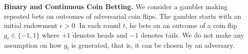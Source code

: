 % 
% 
% 
% 

\textbf{Binary and Continuous Coin Betting.}
We consider a gambler making repeated bets on outcomes of adversarial coin
flips. The gambler starts with an initial endowment $\epsilon > 0$. In each
round $t$, he bets on an outcome of a coin flip $g_t \in \{-1,1\}$ where $+1$
denotes heads and $-1$ denotes tails. We do not make any assumption on how $g_t$
is generated, that is, it can be chosen by an adversary.


